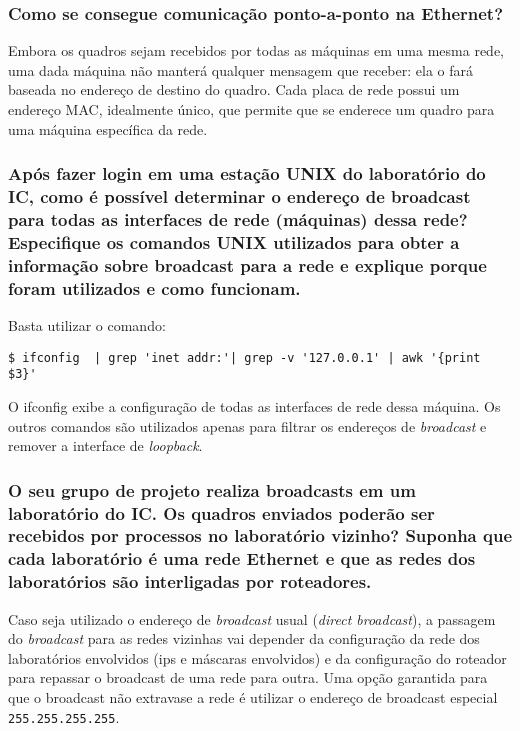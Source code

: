 \subsubsection*{ Como se consegue comunicação ponto-a-ponto na
  Ethernet?}

Embora os quadros sejam recebidos por todas as máquinas em uma mesma
rede, uma dada máquina não manterá qualquer mensagem que receber: ela
o fará baseada no endereço de destino do quadro. Cada placa de rede
possui um endereço MAC, idealmente único, que permite que se enderece
um quadro para uma máquina específica da rede.

\subsubsection*{Após fazer login em uma estação UNIX do laboratório do
  IC, como é possível determinar o endereço de broadcast para todas as
  interfaces de rede (máquinas) dessa rede? Especifique os comandos
  UNIX utilizados para obter a informação sobre broadcast para a rede
  e explique porque foram utilizados e como funcionam.}

Basta utilizar o comando:

\noindent \verb!$ ifconfig  | grep 'inet addr:'| grep -v '127.0.0.1' | awk '{print $3}'!

\noindent O ifconfig exibe a configuração de todas as interfaces de
rede dessa máquina. Os outros comandos são utilizados apenas para
filtrar os endereços de \emph{broadcast} e remover a interface de
\emph{loopback}.

\subsubsection*{O seu grupo de projeto realiza broadcasts em um
  laboratório do IC. Os quadros enviados poderão ser recebidos por
  processos no laboratório vizinho? Suponha que cada laboratório é uma
  rede Ethernet e que as redes dos laboratórios são interligadas por
  roteadores.}

Caso seja utilizado o endereço de \emph{broadcast} usual (\emph{direct
  broadcast}), a passagem do \emph{broadcast} para as redes vizinhas
vai depender da configuração da rede dos laboratórios envolvidos (ips
e máscaras envolvidos) e da configuração do roteador para repassar o
broadcast de uma rede para outra. Uma opção garantida para que o
broadcast não extravase a rede é utilizar o endereço de broadcast
especial \verb!255.255.255.255!.

